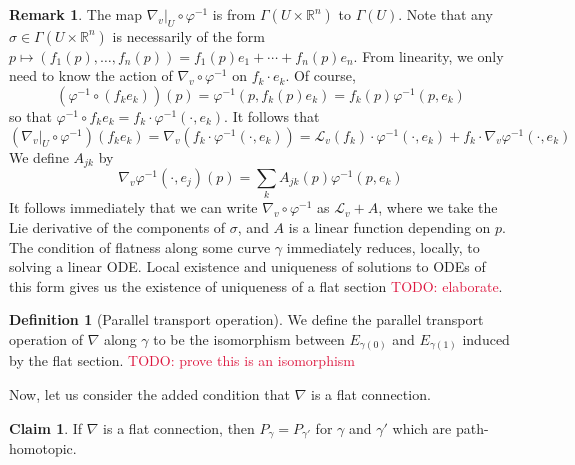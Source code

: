 \documentclass[aps,pra,showpacs,notitlepage,onecolumn,superscriptaddress,nofootinbib]{revtex4-1}
\newcommand{\pop}[1]{\textcolor{crimson}{#1}}
\theoremstyle{definition}
\newtheorem{definition}{Definition}[section]
\newtheorem{remark}{Remark}[section]
\newtheorem{claim}{Claim}[section]
\begin{document}
\begin{remark}
    The map $\nabla_v|_{U} \circ \varphi^{-1}$ is from $\Gamma(U \times \mathbb{R}^n)$ to $\Gamma(U)$. Note that any $\sigma \in \Gamma(U \times \mathbb{R}^n)$ is necessarily of the 
    form $p \mapsto (f_1(p), \dots, f_n(p)) = f_1(p) e_1 + \cdots + f_n(p) e_n$. From linearity, we only need to know the action of $\nabla_v \circ \varphi^{-1}$ on $f_k \cdot e_k$.
    Of course,
    \begin{equation}
        (\varphi^{-1} \circ (f_k e_k))(p) = \varphi^{-1}(p, f_k(p) e_k) = f_k(p) \varphi^{-1}(p, e_k)
    \end{equation}
    so that $\varphi^{-1} \circ f_k e_k = f_k \cdot \varphi^{-1}(\cdot, e_k)$. It follows that 
    \begin{equation}
        (\nabla_v|_U \circ \varphi^{-1})(f_k e_k) = \nabla_v(f_k \cdot \varphi^{-1}(\cdot, e_k)) = \mathcal{L}_v(f_k) \cdot \varphi^{-1}(\cdot, e_k) + f_k \cdot \nabla_v \varphi^{-1}(\cdot, e_k)
    \end{equation}
    We define $A_{jk}$ by
    \begin{equation}
        \nabla_v \varphi^{-1}(\cdot, e_j)(p) = \sum_{k} A_{jk}(p) \varphi^{-1}(p, e_k)
    \end{equation}
    It follows immediately that we can write $\nabla_v \circ \varphi^{-1}$ as $\mathcal{L}_v + A$, where we take the Lie derivative of the components of $\sigma$, and $A$ is a linear function depending on $p$. The 
    condition of flatness along some curve $\gamma$ immediately reduces, locally, to solving a linear ODE. Local existence and uniqueness of solutions to ODEs of this form gives us the existence of uniqueness of a 
    flat section \pop{TODO: elaborate}.
\end{remark}

\begin{definition}[Parallel transport operation]
We define the parallel transport operation of $\nabla$ along $\gamma$ to be the isomorphism between $E_{\gamma(0)}$ and $E_{\gamma(1)}$ induced by the flat section. \pop{TODO: prove this is an isomorphism}
\end{definition}

\noindent Now, let us consider the added condition that $\nabla$ is a flat connection.

\begin{claim}
    If $\nabla$ is a flat connection, then $P_{\gamma} = P_{\gamma'}$ for $\gamma$ and $\gamma'$ which are path-homotopic.
\end{claim}
\end{document}
